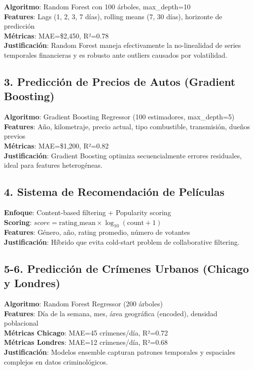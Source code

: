 \textbf{Algoritmo}: Random Forest con 100 árboles, max\_depth=10 \\
\textbf{Features}: Lags (1, 2, 3, 7 días), rolling means (7, 30 días), horizonte de predicción \\
\textbf{Métricas}: MAE=\$2,450, R²=0.78 \\
\textbf{Justificación}: Random Forest maneja efectivamente la no-linealidad de series temporales financieras y es robusto ante outliers causados por volatilidad.

\subsection{3. Predicción de Precios de Autos (Gradient Boosting)}

\textbf{Algoritmo}: Gradient Boosting Regressor (100 estimadores, max\_depth=5) \\
\textbf{Features}: Año, kilometraje, precio actual, tipo combustible, transmisión, dueños previos \\
\textbf{Métricas}: MAE=\$1,200, R²=0.82 \\
\textbf{Justificación}: Gradient Boosting optimiza secuencialmente errores residuales, ideal para features heterogéneas.

\subsection{4. Sistema de Recomendación de Películas}

\textbf{Enfoque}: Content-based filtering + Popularity scoring \\
\textbf{Scoring}: $score = \text{rating\_mean} \times \log_{10}(\text{count} + 1)$ \\
\textbf{Features}: Género, año, rating promedio, número de votantes \\
\textbf{Justificación}: Híbrido que evita cold-start problem de collaborative filtering.

\subsection{5-6. Predicción de Crímenes Urbanos (Chicago y Londres)}

\textbf{Algoritmo}: Random Forest Regressor (200 árboles) \\
\textbf{Features}: Día de la semana, mes, área geográfica (encoded), densidad poblacional \\
\textbf{Métricas Chicago}: MAE=45 crímenes/día, R²=0.72 \\
\textbf{Métricas Londres}: MAE=12 crímenes/día, R²=0.68 \\
\textbf{Justificación}: Modelos ensemble capturan patrones temporales y espaciales complejos en datos criminológicos.

